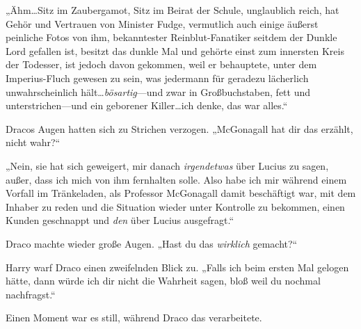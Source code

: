 „Ähm…Sitz im Zaubergamot, Sitz im Beirat der Schule, unglaublich reich, hat Gehör und Vertrauen von Minister Fudge, vermutlich auch einige äußerst peinliche Fotos von ihm, bekanntester Reinblut-Fanatiker seitdem der Dunkle Lord gefallen ist, besitzt das dunkle Mal und gehörte einst zum innersten Kreis der Todesser, ist jedoch davon gekommen, weil er behauptete, unter dem Imperius-Fluch gewesen zu sein, was jedermann für geradezu lächerlich unwahrscheinlich hält…\emph{bösartig}—und zwar in Großbuchstaben, fett und unterstrichen—und ein geborener Killer…ich denke, das war alles.“

Dracos Augen hatten sich zu Strichen verzogen. „McGonagall hat dir das erzählt, nicht wahr?“

„Nein, sie hat sich geweigert, mir danach \emph{irgendetwas} über Lucius zu sagen, außer, dass ich mich von ihm fernhalten solle. Also habe ich mir während einem Vorfall im Tränkeladen, als Professor McGonagall damit beschäftigt war, mit dem Inhaber zu reden und die Situation wieder unter Kontrolle zu bekommen, einen Kunden geschnappt und \emph{den} über Lucius ausgefragt.“

Draco machte wieder große Augen. „Hast du das \emph{wirklich} gemacht?“

Harry warf Draco einen zweifelnden Blick zu. „Falls ich beim ersten Mal gelogen hätte, dann würde ich dir nicht die Wahrheit sagen, bloß weil du nochmal nachfragst.“

Einen Moment war es still, während Draco das verarbeitete.

